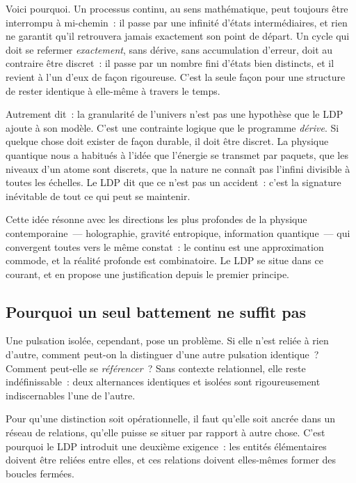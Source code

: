 \documentclass[12pt, a4paper, openright]{book}
\begin{document}
\medskip

Voici pourquoi. Un processus continu, au sens mathématique, peut toujours être interrompu à mi-chemin~: il passe par une infinité d'états intermédiaires, et rien ne garantit qu'il retrouvera jamais exactement son point de départ. Un cycle qui doit se refermer \emph{exactement}, sans dérive, sans accumulation d'erreur, doit au contraire être discret~: il passe par un nombre fini d'états bien distincts, et il revient à l'un d'eux de façon rigoureuse. C'est la seule façon pour une structure de rester identique à elle-même à travers le temps.

\medskip

Autrement dit~: la granularité de l'univers n'est pas une hypothèse que le LDP ajoute à son modèle. C'est une contrainte logique que le programme \emph{dérive}. Si quelque chose doit exister de façon durable, il doit être discret. La physique quantique nous a habitués à l'idée que l'énergie se transmet par paquets, que les niveaux d'un atome sont discrets, que la nature ne connaît pas l'infini divisible à toutes les échelles. Le LDP dit que ce n'est pas un accident~: c'est la signature inévitable de tout ce qui peut se maintenir.

\medskip

Cette idée résonne avec les directions les plus profondes de la physique contemporaine~--- holographie, gravité entropique, information quantique~--- qui convergent toutes vers le même constat~: le continu est une approximation commode, et la réalité profonde est combinatoire. Le LDP se situe dans ce courant, et en propose une justification depuis le premier principe.

\subsection*{Pourquoi un seul battement ne suffit pas}

Une pulsation isolée, cependant, pose un problème. Si elle n'est reliée à rien d'autre, comment peut-on la distinguer d'une autre pulsation identique~? Comment peut-elle se \emph{référencer}~? Sans contexte relationnel, elle reste indéfinissable~: deux alternances identiques et isolées sont rigoureusement indiscernables l'une de l'autre.

\medskip

Pour qu'une distinction soit opérationnelle, il faut qu'elle soit ancrée dans un réseau de relations, qu'elle puisse se situer par rapport à autre chose. C'est pourquoi le LDP introduit une deuxième exigence~: les entités élémentaires doivent être reliées entre elles, et ces relations doivent elles-mêmes former des boucles fermées.
\end{document}
